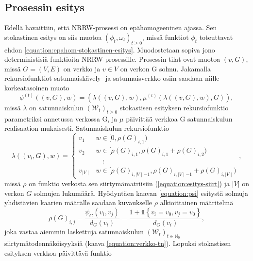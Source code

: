 \documentclass[finnish, 12pt, a4paper, sci, utf8, pdfa]{aaltothesis}
\newcommand{\N}{\mathbb{N}}
\newcommand{\Wrandom}{\mathcal{W}}
\newcommand{\indicator}{\mathopen{\mathds{1}}}
\begin{document}
\subsection{Prosessin esitys}

Edellä havaittiin, että NRRW-prosessi on epähomogeeninen ajassa. Sen stokastinen esitys on siis muotoa \( (\phi_{t}, \omega_{t})_{t \geq 0} \), missä funktiot \( \phi_{t} \) toteuttavat ehdon \ref{equation:epahom-stokastinen-esitys}. Muodostetaan sopiva jono deterministisiä funktioita NRRW-prosessille. Prosessin tilat ovat muotoa \( (v, G) \), missä \( G = (V, E) \) on verkko ja \( v \in V \) on verkon G solmu. Jakamalla rekursiofunktiot satunnaiskävely- ja satunnaisverkko-osiin saadaan niille korkeatasoinen muoto
\begin{equation}
   \phi^{(t)} \left( (v, G), w \right) = \left( \lambda\left( (v, G), w \right), \mu^{(t)} \left( \lambda\left( (v, G), w \right), G \right) \right),
   \label{equation:esitys-1}
\end{equation}
missä \( \lambda \) on satunnaiskulun \( (\Wrandom_{t})_{t \geq 0} \) stokastisen esityksen rekursiofunktio parametriksi annetussa verkossa G, ja \( \mu \) päivittää verkkoa G satunnaiskulun realisaation mukaisesti. Satunnaiskulun rekursiofunktio
\begin{equation}
   \lambda \left( (v_{i}, G), w \right) = 
   \begin{cases}
      v_{1} & w \in [0, \rho(G)_{i,1}) \\
      v_{2} & w \in [\rho(G)_{i,1}, \rho(G)_{i,1} + \rho(G)_{i,2}) \\
            & \quad \vdots \\
      v_{\mid V \mid} & w \in [\rho(G)_{i,\mid V \mid - 1}, \rho(G)_{i,\mid V \mid - 1} + \rho(G)_{i,\mid V \mid}) 
   \end{cases},
   \label{equation:esitys-kulku}
\end{equation}
missä \( \rho \) on funktio verkosta sen siirtymämatriisiin (\ref{equation:esitys-siirt}) ja $ |V| $ on verkon $ G $ solmujen lukumäärä. Hyödyntäen kaavan \ref{equation:psi} esitystä solmuja yhdistävien kaarien määrälle saadaan kuvaukselle \( \rho \) alkioittainen määritelmä
\begin{equation}
   \rho(G)_{i,j} = \frac{\psi_{G}(v_{i}, v_{j})}{d_{G}(v_{i})} = \frac{1 + \indicator \left\{ v_{i} = v_{0}, v_{j} = v_{0} \right\}}{d_{G}(v_{i})},
   \label{equation:esitys-siirt}
\end{equation}
joka vastaa aiemmin laskettuja satunnaiskulun $ (\Wrandom_{t})_{t \in \N_{0}} $ siirtymätodennäköisyyksiä (kaava \ref{equation:verkko-tn}). Lopuksi stokastisen esityksen verkkoa päivittävä funktio
\end{document}
